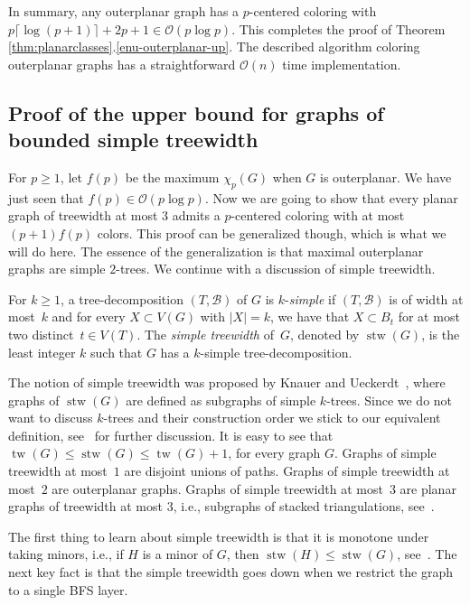 \documentclass[11pt]{article}
\begin{document}
In summary, any outerplanar graph has a $p$-centered coloring with
$p\lceil \log(p+1)\rceil + 2p +1 \in \mathcal{O}(p\log p)$. This completes the
proof of Theorem \ref{thm:planarclasses}.\ref{enu-outerplanar-up}.
The described algorithm coloring outerplanar graphs has a straightforward $\mathcal{O}(n)$
time implementation.

\subsection{Proof of the upper bound for graphs of bounded simple treewidth}
\label{subsec:simpletree-upper}

For $p\geq1$, let $f(p)$ be the maximum $\chi_p(G)$ when $G$ is outerplanar.
We have just seen that $f(p)\in \mathcal{O}(p\log p)$.  Now we are going to show that
every planar graph of treewidth at most $3$ admits a $p$-centered coloring
with at most $(p+1)f(p)$ colors. This proof can be generalized though, which
is what we will do here. The essence of the generalization is that maximal
outerplanar graphs are simple $2$-trees.  We continue with a discussion of
simple treewidth.

For $k\geq1$, a tree-decomposition $(T,\mathcal{B})$ of $G$ is $k$-\emph{simple} 
if $(T,\mathcal{B})$ is of width at most~$k$ and for every $X\subset V(G)$ with $|X|=k$, 
we have that $X\subset B_t$ for at most two distinct~$t\in V(T)$. 
The \emph{simple treewidth} of~$G$, denoted by $\operatorname{stw}(G)$, 
is the least integer $k$ such that $G$ has a $k$-simple tree-decomposition. 

The notion of simple treewidth was proposed by Knauer and Ueckerdt~\cite{KU},
where graphs of $\operatorname{stw}(G)$ are defined as subgraphs of simple $k$-trees.  Since
we do not want to discuss $k$-trees and their construction order we stick to
our equivalent definition, see~\cite{W16} for further discussion.  It is easy
to see that $\operatorname{tw}(G)\leq \operatorname{stw}(G)\leq \operatorname{tw}(G)+1$, for every graph $G$.  Graphs
of simple treewidth at most~$1$ are disjoint unions of paths.  Graphs of
simple treewidth at most~$2$ are outerplanar graphs.  Graphs of simple
treewidth at most~$3$ are planar graphs of treewidth at most $3$, i.e.,
subgraphs of stacked triangulations, see~\cite{KV12}.

The first thing to learn about simple treewidth is that it is monotone under taking minors, 
i.e., if $H$ is a minor of $G$, then $\operatorname{stw}(H) \leq \operatorname{stw}(G)$, see~\cite{JM-weak-cols}.
The next key fact is that the simple treewidth goes down when we restrict the graph to
a single BFS layer.
\end{document}
